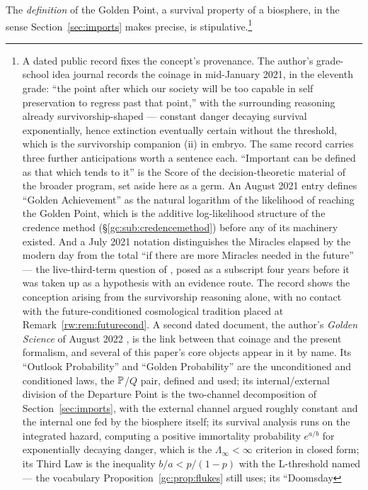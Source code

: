The \emph{definition} of the Golden Point, a survival property of a
biosphere, in the sense Section~\ref{sec:imports} makes precise, is
stipulative.\footnote{A dated public record fixes the concept's
provenance. The author's grade-school idea journal
\cite{BenGradeSchool} records the coinage in mid-January 2021, in the
eleventh grade: ``the point after which our society will be too
capable in self preservation to regress past that point,'' with the
surrounding reasoning already survivorship-shaped --- constant danger
decaying survival exponentially, hence extinction eventually certain
without the threshold, which is the survivorship companion \cite{GoldenSurvivorship}(ii) in
embryo. The same record carries three further anticipations worth a
sentence each. ``Important can be defined as that which tends to
it'' is the Score of the decision-theoretic material of the broader program, set aside here as a germ. An August 2021 entry
defines ``Golden Achievement'' as the natural logarithm of the
likelihood of reaching the Golden Point, which is the additive
log-likelihood structure of the credence method
(\S\ref{gc:sub:credencemethod}) before any of its machinery existed.
And a July 2021 notation distinguishes the Miracles elapsed by the
modern day from the total ``if there are more Miracles needed in the
future'' --- the live-third-term question of
\cite{GoldenTechnoanatomy}, posed as a subscript four years
before it was taken up as a hypothesis with an evidence route. The
record shows the conception arising from
the survivorship reasoning alone, with no contact with the
future-conditioned cosmological tradition placed at
Remark~\ref{rw:rem:futurecond}. A second dated document, the
author's \emph{Golden Science} of August 2022 \cite{GoldenScience2022},
is the link between that coinage and the present formalism, and
several of this paper's core objects appear in it by name. Its
``Outlook Probability'' and ``Golden Probability'' are the
unconditioned and conditioned laws, the $\mathbb{P}$/$Q$ pair, defined and
used; its internal/external division of the Departure Point is the
two-channel decomposition of Section~\ref{sec:imports}, with the external
channel argued roughly constant and the internal one fed by the
biosphere itself; its survival analysis runs on the integrated
hazard, computing a positive immortality probability $e^{a/b}$ for
exponentially decaying danger, which is the $\Lambda_\infty<\infty$
criterion in closed form; its Third Law is the inequality
$b/a<p/(1-p)$ with the L-threshold named --- the vocabulary
Proposition~\ref{gc:prop:flukes} still uses; its ``Doomsday
}
